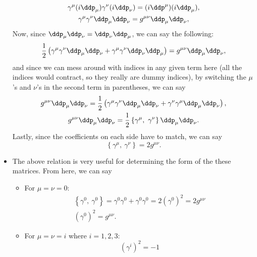 \begin{itemize}
\begin{gather}
            \gamma^{\mu}(i\ddp_{\mu})\gamma^{\nu}(i\ddp_{\nu}) = (i\ddp^{\mu})(i\ddp_{\mu}), \\
            \gamma^{\mu}\gamma^{\nu}\ddp_{\mu}\ddp_{\nu} = g^{\mu\nu}\ddp_{\mu}\ddp_{\nu},
        \end{gather}
        Now, since $\ddp_{\mu}\ddp_{\nu} = \ddp_{\nu}\ddp_{\mu}$, we can say the following:
        \begin{equation}
            \frac{1}{2}\left(\gamma^{\mu}\gamma^{\nu}\ddp_{\mu}\ddp_{\nu} + \gamma^{\mu}\gamma^{\nu}\ddp_{\nu}\ddp_{\mu}\right) = g^{\mu\nu}\ddp_{\mu}\ddp_{\nu},
        \end{equation}
        and since we can mess around with indices in any given term here (all the indices would contract, so they really are dummy indices), by switching the $\mu$'s and $\nu$'s in the second term in parentheses, we can say
        \begin{gather}
            g^{\mu\nu}\ddp_{\mu}\ddp_{\nu} = \frac{1}{2}\left(\gamma^{\mu}\gamma^{\nu}\ddp_{\mu}\ddp_{\nu} + \gamma^{\nu}\gamma^{\mu}\ddp_{\mu}\ddp_{\nu}\right), \\
            g^{\mu\nu}\ddp_{\mu}\ddp_{\nu} = \frac{1}{2}\left\{\gamma^{\mu},\ \gamma^{\nu}\right\}\ddp_{\mu}\ddp_{\nu}.
        \end{gather}
        Lastly, since the coefficients on each side have to match, we can say
        \begin{equation}
            \boxed{\left\{\gamma^{\mu},\ \gamma^{\nu}\right\} = 2g^{\mu\nu}}.\label{GammaAntiCommutator}
        \end{equation}
    \item The above relation is very useful for determining the form of the these matrices. From here, we can say
        \begin{itemize}
            \item For $\mu = \nu = 0$:
                \begin{gather}
                    \left\{\gamma^0,\ \gamma^0\right\} = \gamma^0\gamma^0 + \gamma^0\gamma^0 = 2\left(\gamma^0\right)^2 = 2g^{\mu\nu} \\
                    \left(\gamma^0\right)^2 = g^{\mu\nu}.
                \end{gather}
            \item For $\mu = \nu = i$ where $i=1,2,3$:
                \begin{equation}
                    \left(\gamma^i\right)^2 = -1
                \end{equation}

\end{itemize}
\end{itemize}
